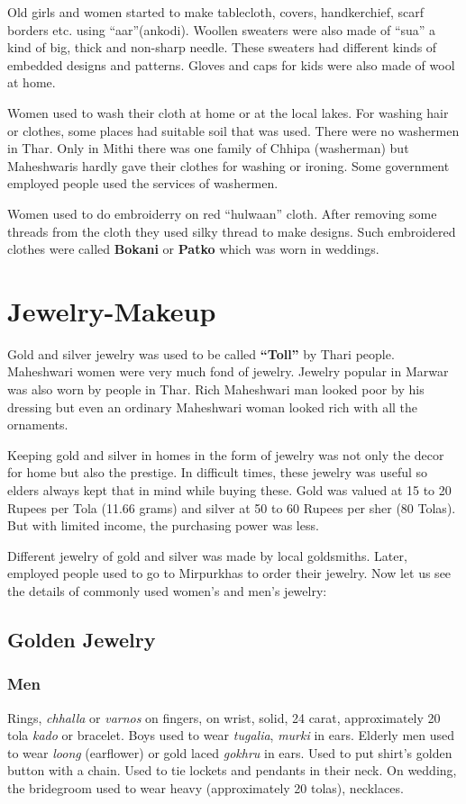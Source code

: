 Old girls and women started to make tablecloth, covers, handkerchief, scarf
borders etc. using ``aar''(ankodi). Woollen sweaters were also made of ``sua'' a
kind of big, thick and non-sharp needle. These sweaters had different kinds of
embedded designs and patterns. Gloves and caps for kids were also made of wool
at home.

Women used to wash their cloth at home or at the local lakes. For washing hair
or clothes, some places had suitable soil that was used. There were no washermen
in Thar. Only in Mithi there was one family of Chhipa (washerman) but
Maheshwaris hardly gave their clothes for washing or ironing. Some government
employed people used the services of washermen.

Women used to do embroiderry on red ``hulwaan'' cloth. After removing some
threads from the cloth they used silky thread to make designs. Such embroidered
clothes were called \textbf{Bokani} or \textbf{Patko} which was worn in
weddings.
\section{Jewelry-Makeup} Gold and silver jewelry was used to be called
\textbf{``Toll''} by Thari people. Maheshwari women were very much fond of
jewelry. Jewelry popular in Marwar was also worn by people in Thar. Rich
Maheshwari man looked poor by his dressing but even an ordinary Maheshwari woman
looked rich with all the ornaments.

Keeping gold and silver in homes in the form of jewelry was not only the decor
for home but also the prestige. In difficult times, these jewelry was useful so
elders always kept that in mind while buying these. Gold was valued at 15 to
20 Rupees per Tola (11.66 grams) and silver at 50 to 60 Rupees per sher (80
Tolas). But with limited income, the purchasing power was less.

Different jewelry of gold and silver was made by local goldsmiths. Later,
employed people used to go to Mirpurkhas to order their jewelry. Now let us see
the details of commonly used women's and men's jewelry:
\subsection{Golden Jewelry}

\subsubsection*{Men} Rings, \textit{chhalla} or \textit{varnos} on fingers, on
wrist, solid, 24 carat, approximately 20 tola \textit{kado} or bracelet. Boys
used to wear \textit{tugalia}, \textit{murki} in ears. Elderly men used to wear
\textit{loong} (earflower) or gold laced \textit{gokhru} in ears. Used to put
shirt's golden button with a chain. Used to tie lockets and pendants in their
neck. On wedding, the bridegroom used to wear heavy (approximately 20 tolas),
necklaces.
